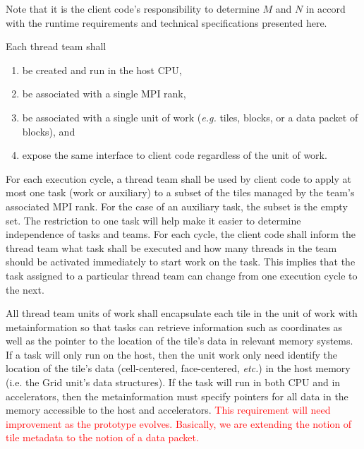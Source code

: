 \documentclass{article}
\begin{document}
Note that it is the client code's responsibility to determine $M$ and $N$ in
accord with the runtime requirements and technical specifications presented
here.

\begin{req}
Each thread team shall
\begin{enumerate}
\item{be created and run in the host CPU,}
\item{be associated with a single MPI rank,}
\item{be associated with a single unit of work (\textit{e.g.} tiles, blocks, or a
data packet of blocks), and}
\item{expose the same interface to client code regardless of the unit of work.}
\end{enumerate}
\end{req}

\begin{req}
For each execution cycle, a thread team shall be used by client code to apply at
most one task (work or auxiliary) to a subset of the tiles managed by the team's
associated MPI rank.  For the case of an auxiliary task, the subset is the empty
set.  The restriction to one task will help make it easier to determine
independence of tasks and teams.  For each cycle, the client code shall inform
the thread team what task shall be executed and how many threads in the team
should be activated immediately to start work on the task.  This implies that
the task assigned to a particular thread team can change from one execution
cycle to the next.
\end{req}

\begin{req}
All thread team units of work shall encapsulate each tile in the unit of work
with metainformation so that tasks can retrieve information such as coordinates
as well as the pointer to the location of the tile's data in relevant memory
systems.  If a task will only run on the host, then the unit work only need
identify the location of the tile's data (cell-centered, face-centered,
\textit{etc.}) in the host memory (i.e. the Grid unit's data structures).  If
the task will run in both CPU and in accelerators, then the metainformation must
specify pointers for all data in the memory accessible to the host and
accelerators.  \textcolor{red}{This requirement will need improvement as the
prototype evolves.  Basically, we are extending the notion of tile metadata to
the notion of a data packet.}
\end{req}
\end{document}

